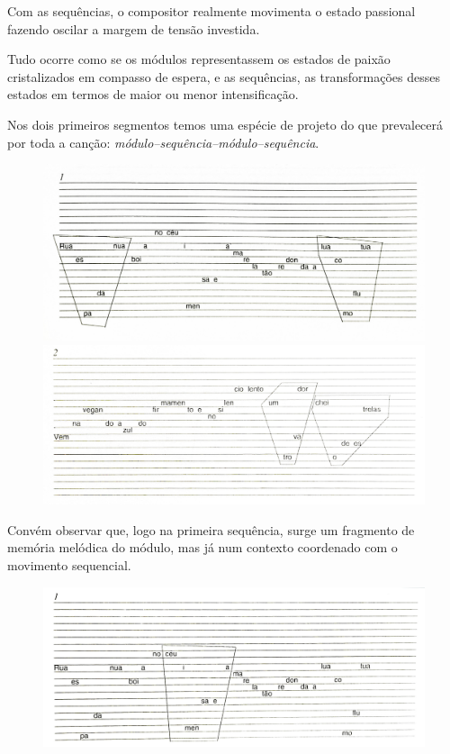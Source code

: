 Com as sequências, o compositor realmente movimenta o estado passional
fazendo oscilar a margem de tensão investida.

Tudo ocorre como se os módulos representassem os estados de paixão
cristalizados em compasso de espera, e as sequências, as transformações
desses estados em termos de maior ou menor intensificação.

Nos dois primeiros segmentos temos uma espécie de projeto do que
prevalecerá por toda a canção: \textit{módulo--sequência--módulo--sequência}.

\begin{figure}[H]
\includegraphics[width=\textwidth]{./imgs/figura24.jpg}

\includegraphics[width=\textwidth]{./imgs/figura25.jpg}
\end{figure}

Convém observar que, logo na primeira sequência, surge um fragmento de
memória melódica do módulo, mas já num contexto coordenado com o
movimento sequencial.

\begin{figure}[H]
\includegraphics[width=\textwidth]{./imgs/figura26.jpg}
\end{figure}

